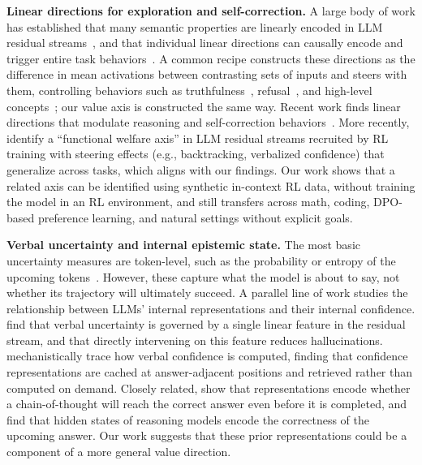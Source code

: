\documentclass{article}
\begin{document}
\textbf{Linear directions for exploration and self-correction.} A large body of work has established that many semantic properties are linearly encoded in LLM residual streams~\citep{burns2023discovering,zou2023representation,marks2023geometry,park2023linear}, and that individual linear directions can causally encode and trigger entire task behaviors~\citep{todd2024function}. A common recipe constructs these directions as the difference in mean activations between contrasting sets of inputs and steers with them, controlling behaviors such as truthfulness~\citep{li2023inference}, refusal~\citep{arditi2024refusal}, and high-level concepts~\citep{turner2023activation, rimsky2024steering}; our value axis is constructed the same way. Recent work finds linear directions that modulate reasoning and self-correction behaviors~\citep{troitskii2025internal, venhoff2025steering, ward2025reasoning}. More recently, \citet{han2026welfare} identify a ``functional welfare axis'' in LLM residual streams recruited by RL training with steering effects (e.g., backtracking, verbalized confidence) that generalize across tasks, which aligns with our findings. Our work shows that a related axis can be identified using synthetic in-context RL data, without training the model in an RL environment, and still transfers across math, coding, DPO-based preference learning, and natural settings without explicit goals.

\textbf{Verbal uncertainty and internal epistemic state.} The most basic uncertainty measures are token-level, such as the probability or entropy of the upcoming tokens~\citep{malinin2021uncertainty, kuhn2023semantic}. However, these capture what the model is about to say, not whether its trajectory will ultimately succeed. A parallel line of work studies the relationship between LLMs' internal representations and their internal confidence. \citet{ji2025calibrating} find that verbal uncertainty is governed by a single linear feature in the residual stream, and that directly intervening on this feature reduces hallucinations. \citet{kumaran2026verbal} mechanistically trace how verbal confidence is computed, finding that confidence representations are cached at answer-adjacent positions and retrieved rather than computed on demand. Closely related, \citet{afzal2025knowing} show that representations encode whether a chain-of-thought will reach the correct answer even before it is completed, and \citet{zhang2025reasoning} find that hidden states of reasoning models encode the correctness of the upcoming answer. Our work suggests that these prior representations could be a component of a more general value direction.
\end{document}
